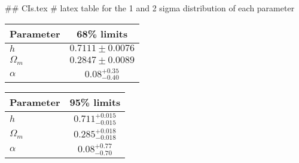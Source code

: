 ## CIs.tex
# latex table for the 1 and 2 sigma distribution of each parameter

\begin{tabular} { l  c}
 Parameter &  68\% limits\\
\hline
{\boldmath$h              $} & $0.7111\pm 0.0076          $\\
{\boldmath$\Omega_m       $} & $0.2847\pm 0.0089          $\\
{\boldmath$\alpha         $} & $0.08^{+0.35}_{-0.40}      $\\
\hline
\end{tabular}

\begin{tabular} { l  c}
 Parameter &  95\% limits\\
\hline
{\boldmath$h              $} & $0.711^{+0.015}_{-0.015}   $\\
{\boldmath$\Omega_m       $} & $0.285^{+0.018}_{-0.018}   $\\
{\boldmath$\alpha         $} & $0.08^{+0.77}_{-0.70}      $\\
\hline
\end{tabular}
